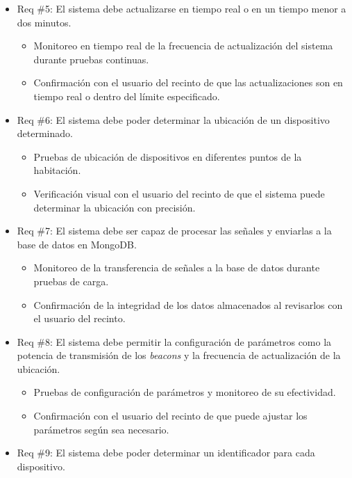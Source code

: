 \documentclass[
11pt, %
]{charter}
\begin{document}
\begin{itemize}
\item Req \#5: El sistema debe actualizarse en tiempo real o en un tiempo menor a dos minutos.

\begin{itemize}
	\item Monitoreo en tiempo real de la frecuencia de actualización del sistema durante pruebas continuas.
	\item Confirmación con el usuario del recinto de que las actualizaciones son en tiempo real o dentro del límite especificado.
\end{itemize}

\item Req \#6: El sistema debe poder determinar la ubicación de un dispositivo determinado.

\begin{itemize}
	\item Pruebas de ubicación de dispositivos en diferentes puntos de la habitación.
	\item Verificación visual con el usuario del recinto de que el sistema puede determinar la ubicación con precisión.
\end{itemize}

\item Req \#7: El sistema debe ser capaz de procesar las señales y enviarlas a la base de datos en MongoDB.

\begin{itemize}
	\item Monitoreo de la transferencia de señales a la base de datos durante pruebas de carga.
	\item Confirmación de la integridad de los datos almacenados al revisarlos con el usuario del recinto.
\end{itemize}

\item Req \#8: El sistema debe permitir la configuración de parámetros como la potencia de transmisión de los \textit{beacons} y la frecuencia de actualización de la ubicación.

\begin{itemize}
	\item Pruebas de configuración de parámetros y monitoreo de su efectividad.
	\item Confirmación con el usuario del recinto de que puede ajustar los parámetros según sea necesario.
\end{itemize}

\item Req \#9: El sistema debe poder determinar un identificador para cada dispositivo.


\end{itemize}
\end{document}
